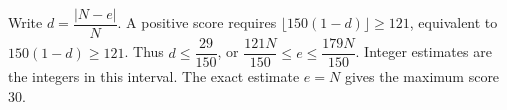 Write $d=\dfrac{|N-e|}{N}$. A positive score requires $\lfloor150(1-d)\rfloor\ge121$, equivalent to $150(1-d)\ge121$. Thus $d\le\dfrac{29}{150}$, or $\boxed{\dfrac{121N}{150}\le e\le\dfrac{179N}{150}}$. Integer estimates are the integers in this interval. The exact estimate $e=N$ gives the maximum score 30.

